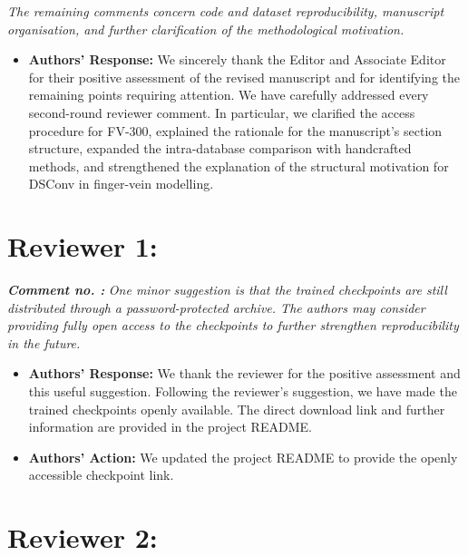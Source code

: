 \documentclass[11pt]{article}
\theoremstyle{remark}
\newcounter{mycounter} %
\newcommand\showReviewcounter{\stepcounter{mycounter}\themycounter}
\begin{document}
\textit{The remaining comments concern code and dataset reproducibility, manuscript organisation, and further clarification of the methodological motivation.}
\color{black}

\begin{itemize}
    \item \textbf{Authors' Response:}
    We sincerely thank the Editor and Associate Editor for their positive assessment of the revised manuscript and for identifying the remaining points requiring attention. We have carefully addressed every second-round reviewer comment. In particular, we clarified the access procedure for FV-300, explained the rationale for the manuscript's section structure, expanded the intra-database comparison with handcrafted methods, and strengthened the explanation of the structural motivation for DSConv in finger-vein modelling.
\end{itemize}

\setcounter{mycounter}{0}
\color{blue}
\section*{Reviewer 1:}

\textbf{\textit{Comment no. \showReviewcounter:}}
\textit{One minor suggestion is that the trained checkpoints are still distributed through a password-protected archive. The authors may consider providing fully open access to the checkpoints to further strengthen reproducibility in the future.}
\color{black}

\begin{itemize}
    \item \textbf{Authors' Response:}
    We thank the reviewer for the positive assessment and this useful suggestion. Following the reviewer's suggestion, we have made the trained checkpoints openly available. The direct download link and further information are provided in the project README.

    \item \textbf{Authors' Action:}
    We updated the project README to provide the openly accessible checkpoint link.
\end{itemize}

\setcounter{mycounter}{0}
\color{blue}
\section*{Reviewer 2:}
\end{document}

